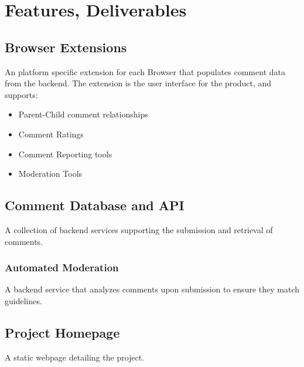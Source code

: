 \documentclass[proposal.tex]{subfiles}
\begin{document}
    
\section{Features, Deliverables}

\subsection{Browser Extensions}

An platform specific extension for each Browser that populates comment data from the backend.
The extension is the user interface for the product, and supports:

\begin{itemize}
    \item Parent-Child comment relationships
    \item Comment Ratings
    \item Comment Reporting tools
    \item Moderation Tools
\end{itemize}

\subsection{Comment Database and API}

A collection of backend services supporting the submission and retrieval of comments.

\subsubsection{Automated Moderation}

A backend service that analyzes comments upon submission to ensure they match guidelines.

\subsection{Project Homepage}

A static webpage detailing the project.
\end{document}
